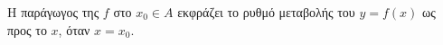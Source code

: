 Η παράγωγος της $f$ στο $x_0\in A$ εκφράζει το ρυθμό μεταβολής του $ y=f(x) $ ως προς το $x$, όταν $ x=x_0 $.
